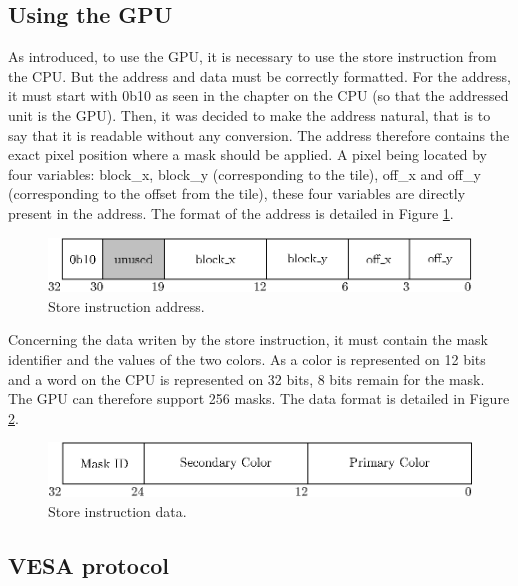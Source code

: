 \subsection{Using the GPU}

As introduced, to use the GPU, it is necessary to use the store instruction from the CPU. But the 
address and data must be correctly formatted. For the address, it must start with 0b10 as seen in 
the chapter on the CPU (so that the addressed unit is the GPU). Then, it was decided to make the 
address natural, that is to say that it is 
readable without any conversion. The address therefore contains the exact pixel position where 
a mask should be applied. A pixel being located by four variables: block\_x, block\_y (corresponding 
to the tile), off\_x and off\_y (corresponding to the offset from the tile), these four variables 
are directly present in the address. The format of the address is detailed in 
Figure \ref{fig:gpu/store_address}.

\begin{figure}[H]
    \centering
    \includegraphics[scale=1.0]{Chapter4-GPU_CLKU/res/store_address}
    \caption{Store instruction address.}
    \label{fig:gpu/store_address}
\end{figure}

Concerning the data writen by the store instruction, it must contain the mask identifier and the 
values of the two colors. As a color is 
represented on 12 bits and a word on the CPU is represented on 32 bits, 8 bits remain for the mask.  
The GPU can therefore support 256 masks. The data format is detailed in 
Figure \ref{fig:gpu/store_data}.

\begin{figure}[H]
    \centering
    \includegraphics[scale=1.0]{Chapter4-GPU_CLKU/res/store_data}
    \caption{Store instruction data.}
    \label{fig:gpu/store_data}
\end{figure}

\subsection{VESA protocol}

